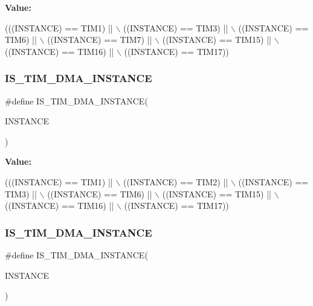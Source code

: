 {\bfseries Value\+:}
\begin{DoxyCode}
(((INSTANCE) == TIM1)    || \(\backslash\)
   ((INSTANCE) == TIM3)    || \(\backslash\)
   ((INSTANCE) == TIM6)    || \(\backslash\)
   ((INSTANCE) == TIM7)    || \(\backslash\)
   ((INSTANCE) == TIM15)   || \(\backslash\)
   ((INSTANCE) == TIM16)   || \(\backslash\)
   ((INSTANCE) == TIM17))
\end{DoxyCode}
\mbox{\label{group___exported__macro_gad51d77b3bcc12a3a5c308d727b561371}} 
\subsubsection{\texorpdfstring{I\+S\+\_\+\+T\+I\+M\+\_\+\+D\+M\+A\+\_\+\+I\+N\+S\+T\+A\+N\+CE}{IS\_TIM\_DMA\_INSTANCE}\hspace{0.1cm}{\footnotesize\ttfamily [8/16]}}
{\footnotesize\ttfamily \#define I\+S\+\_\+\+T\+I\+M\+\_\+\+D\+M\+A\+\_\+\+I\+N\+S\+T\+A\+N\+CE(\begin{DoxyParamCaption}\item[{}]{I\+N\+S\+T\+A\+N\+CE }\end{DoxyParamCaption})}

{\bfseries Value\+:}
\begin{DoxyCode}
(((INSTANCE) == TIM1)    || \(\backslash\)
   ((INSTANCE) == TIM2)    || \(\backslash\)
   ((INSTANCE) == TIM3)    || \(\backslash\)
   ((INSTANCE) == TIM6)    || \(\backslash\)
   ((INSTANCE) == TIM15)   || \(\backslash\)
   ((INSTANCE) == TIM16)   || \(\backslash\)
   ((INSTANCE) == TIM17))
\end{DoxyCode}
\mbox{\label{group___exported__macro_gad51d77b3bcc12a3a5c308d727b561371}} 
\subsubsection{\texorpdfstring{I\+S\+\_\+\+T\+I\+M\+\_\+\+D\+M\+A\+\_\+\+I\+N\+S\+T\+A\+N\+CE}{IS\_TIM\_DMA\_INSTANCE}\hspace{0.1cm}{\footnotesize\ttfamily [9/16]}}
{\footnotesize\ttfamily \#define I\+S\+\_\+\+T\+I\+M\+\_\+\+D\+M\+A\+\_\+\+I\+N\+S\+T\+A\+N\+CE(\begin{DoxyParamCaption}\item[{}]{I\+N\+S\+T\+A\+N\+CE }\end{DoxyParamCaption})}

